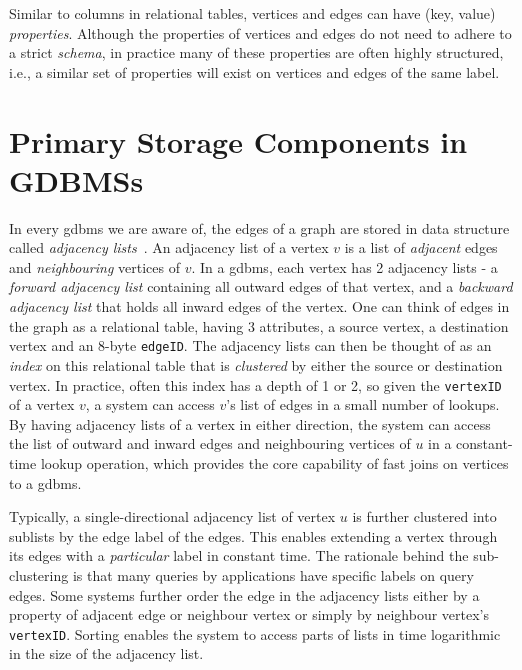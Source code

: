 Similar to columns in relational tables, vertices and edges can have (key, value) \emph{properties}. Although the properties of vertices and edges do not need to adhere to a strict \emph{schema}, in practice many of these properties are often highly structured, i.e., a similar set of properties will exist on vertices and edges of the same label.

\section{Primary Storage Components in GDBMSs}
\label{sec:storage-components}

In every \gls{gdbms} we are aware of, the edges of a graph are stored in data structure called \emph{adjacency lists}~\cite{bonifati-adj-lists}. An adjacency list of a vertex $v$ is a list of \emph{adjacent} edges and \emph{neighbouring} vertices of $v$. In a \gls{gdbms}, each vertex has 2 adjacency lists - a \emph{forward adjacency list} containing all outward edges of that vertex, and a \emph{backward adjacency list} that holds all inward edges of the vertex. One can think of edges in the graph as a relational table, having 3 attributes, a source vertex, a destination vertex and an 8-byte \texttt{edgeID}. The adjacency lists can then be thought of as an \emph{index} on this relational table that is \emph{clustered} by either the source or destination vertex. In practice, often this index has a depth of 1 or 2, so given the \texttt{vertexID} of a vertex $v$, a system can access $v$'s list of edges in a small number of lookups. By having adjacency lists of a vertex in either direction, the system can access the list of outward and inward edges and neighbouring vertices of $u$ in a constant-time lookup operation, which provides the core capability of fast joins on vertices to a \gls{gdbms}. 

Typically, a single-directional adjacency list of vertex $u$ is further clustered into sublists by the edge label of the edges. This enables extending a vertex through its edges with a \emph{particular} label in constant time. The rationale behind the sub-clustering is that many queries by applications have specific labels on query edges. Some systems further order the edge in the adjacency lists either by a property of adjacent edge or neighbour vertex or simply by neighbour vertex's \texttt{vertexID}. Sorting enables the system to access parts of lists in time logarithmic in the size of the adjacency list.

